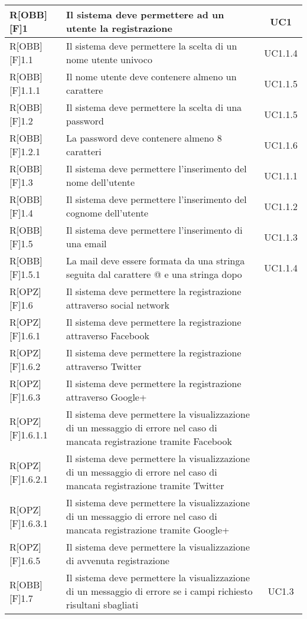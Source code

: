 \begin{center}
\begin{table}[h]
\begin{tabular}{|l|p{}|c|}
		R[OBB][F]1 & Il sistema deve permettere ad un utente la registrazione & UC1 \\ \midrule
		R[OBB][F]1.1 & Il sistema deve permettere la scelta di un nome utente univoco & UC1.1.4 \\ \midrule
		R[OBB][F]1.1.1 & Il nome utente deve contenere almeno un carattere & UC1.1.5 \\ \midrule
		R[OBB][F]1.2 & Il sistema deve permettere la scelta di una password & UC1.1.5 \\ \midrule
		R[OBB][F]1.2.1 & La password deve contenere almeno 8 caratteri & UC1.1.6 \\ \midrule
		R[OBB][F]1.3 & Il sistema deve permettere l'inserimento del nome dell'utente & UC1.1.1 \\ \midrule
		R[OBB][F]1.4 & Il sistema deve permettere l'inserimento del cognome dell'utente & UC1.1.2 \\ \midrule
		R[OBB][F]1.5 & Il sistema deve permettere l'inserimento di una email & UC1.1.3 \\ \midrule
		R[OBB][F]1.5.1 & La mail deve essere formata da una stringa seguita dal carattere @ e una stringa dopo & UC1.1.4 \\ \midrule
		R[OPZ][F]1.6 & Il sistema deve permettere la registrazione attraverso social network & \\ \midrule
		R[OPZ][F]1.6.1 & Il sistema deve permettere la registrazione attraverso Facebook & \\ \midrule
		R[OPZ][F]1.6.2 & Il sistema deve permettere la registrazione attraverso Twitter & \\ \midrule
		R[OPZ][F]1.6.3 & Il sistema deve permettere la registrazione attraverso Google+ & \\ \midrule 
		R[OPZ][F]1.6.1.1 & Il sistema deve permettere la visualizzazione di un messaggio di errore nel caso di mancata registrazione tramite Facebook & \\ \midrule
		R[OPZ][F]1.6.2.1 & Il sistema deve permettere la visualizzazione di un messaggio di errore nel caso di mancata registrazione tramite Twitter & \\ \midrule
		R[OPZ][F]1.6.3.1 & Il sistema deve permettere la visualizzazione di un messaggio di errore nel caso di mancata registrazione tramite Google+ & \\ \midrule
		R[OPZ][F]1.6.5 & Il sistema deve permettere la visualizzazione di avvenuta registrazione & \\ \midrule
		R[OBB][F]1.7 & Il sistema deve permettere la visualizzazione di un messaggio di errore se i campi richiesto risultani sbagliati & UC1.3 \\ \midrule
		

\end{tabular}
\end{table}
\end{center}
